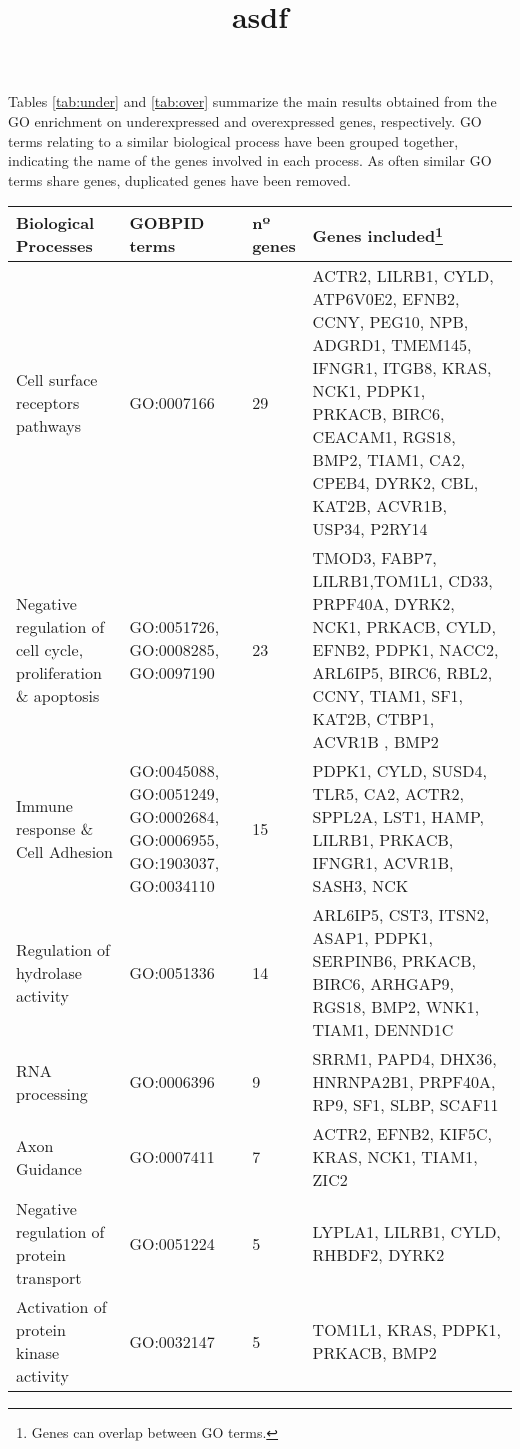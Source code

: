 \documentclass[twoside]{report}
\title{asdf}
\begin{document}
Tables \ref{tab:under} and \ref{tab:over} summarize the main results obtained from the GO enrichment on underexpressed and overexpressed genes, respectively. GO terms relating to a similar biological process have been grouped together, indicating the name of the genes involved in each process. As often similar GO terms share genes, duplicated genes have been removed.

\begin{table*}[htbp]
\caption{\bf Underexpressed Genes}
\begin{tabularx}{\textwidth}{m{3cm}m{3.5cm}m{1.2cm}m{9.2cm}}
\hline
Biological Processes & GOBPID terms & nº genes & Genes included\footnote{Genes can overlap between GO terms.} \\
\hline

Cell surface receptors pathways & GO:0007166 & 29 & ACTR2, LILRB1, CYLD, ATP6V0E2, EFNB2, CCNY, PEG10, NPB, ADGRD1, TMEM145, IFNGR1, ITGB8, KRAS, NCK1, PDPK1, PRKACB, BIRC6, CEACAM1, RGS18, BMP2, TIAM1, CA2, CPEB4, DYRK2, CBL, KAT2B, ACVR1B, USP34, P2RY14\\

Negative regulation of cell cycle, proliferation \& apoptosis& GO:0051726, GO:0008285, GO:0097190 & 23 & TMOD3, FABP7, LILRB1,TOM1L1, CD33, PRPF40A, DYRK2, NCK1, PRKACB, CYLD, EFNB2, PDPK1, NACC2, ARL6IP5, BIRC6, RBL2, CCNY, TIAM1, SF1, KAT2B, CTBP1, ACVR1B , BMP2\\

Immune response \& Cell Adhesion & GO:0045088, GO:0051249, GO:0002684, GO:0006955, GO:1903037, GO:0034110  & 15 & PDPK1, CYLD, SUSD4, TLR5, CA2, ACTR2, SPPL2A, LST1, HAMP, LILRB1, PRKACB, IFNGR1, ACVR1B, SASH3, NCK\\

Regulation of hydrolase activity & GO:0051336 & 14 & ARL6IP5, CST3, ITSN2, ASAP1, PDPK1, SERPINB6, PRKACB, BIRC6, ARHGAP9, RGS18, BMP2, WNK1, TIAM1, DENND1C\\ 

RNA processing & GO:0006396 & 9 & SRRM1, PAPD4, DHX36, HNRNPA2B1, PRPF40A, RP9, SF1, SLBP, SCAF11\\

Axon Guidance & GO:0007411 & 7 & ACTR2, EFNB2, KIF5C, KRAS, NCK1, TIAM1, ZIC2\\

Negative regulation of protein transport & GO:0051224 & 5 & LYPLA1, LILRB1, CYLD, RHBDF2, DYRK2\\

Activation of protein kinase activity & GO:0032147 & 5 & TOM1L1, KRAS, PDPK1, PRKACB, BMP2\\
\hline
\end{tabularx}
  \label{tab:under}
\end{table*}
\end{document}
